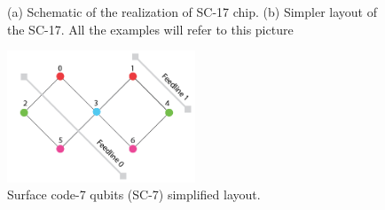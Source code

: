 \documentclass[11pt]{article}
\begin{document}
\begin{figure}[h!]
\centerline{
}
\caption{(a) Schematic of the realization of SC-17 chip. (b) Simpler layout of the SC-17. All the examples will refer to this picture}
\label{Surafce17b}
\end{figure}



\begin{figure}[h!]
\centering
\includegraphics[width=0.5\textwidth]{sc7_w_feedlines.png}
\caption{\label{fig:org08ec89a}
Surface code-7 qubits (SC-7) simplified layout.}
\end{figure}
\end{document}
